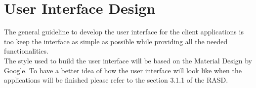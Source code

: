 \chapter{User Interface Design}\label{c:gui}
The general guideline to develop the user interface for the client applications is too keep the interface as simple as possible while providing all the needed functionalities.\\
The style used to build the user interface will be based on the Material Design by Google.
To have a better idea of how the user interface will look like when the applications will be finished please refer to the section 3.1.1 of the RASD.